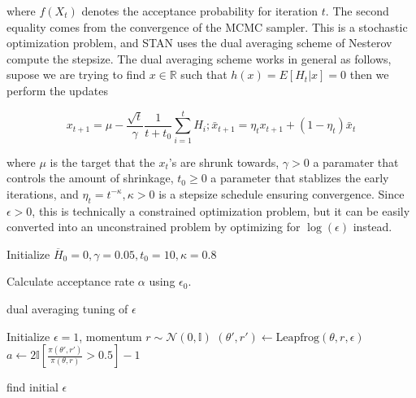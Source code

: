 \documentclass[]{report}
\begin{document}
where $f(X_t)$ denotes the acceptance probability for iteration $t$. The
second equality comes from the convergence of the MCMC sampler. This is a
stochastic optimization problem, and STAN uses the dual averaging scheme of
Nesterov compute the stepsize. The dual averaging scheme works in general as
follows, supose we are trying to find $x\in \mathbb{R}$ such that $h(x) =
E[H_t|x] = 0$ then we perform the updates 

\[x_{t+1}  = \mu - \frac{\sqrt{t}}{\gamma} \frac{1}{t+t_0} \sum_{i=1}^tH_i;
\bar{x}_{t+1} = \eta_t x_{t+1} + (1-\eta_t) \bar{x}_t \]

where $\mu$ is the target that the $x_t$'s are shrunk towards, $\gamma > 0$ a
paramater that controls the amount of shrinkage, $t_0 \ge 0$ a parameter that
stablizes the early iterations, and $\eta_t = t^{-\kappa},\kappa>0$ is a
stepsize schedule ensuring convergence. Since $\epsilon>0$, this is technically
a constrained optimization problem, but it can be easily converted into an
unconstrained problem by optimizing for $\log(\epsilon)$ instead. 

\begin{algorithm}

Initialize $\overline{H}_0 = 0, \gamma = 0.05, t_0 = 10 ,\kappa = 0.8 $ \;
	
	Calculate acceptance rate $\alpha$ using $\epsilon_0$. \;

\caption{dual averaging tuning of $\epsilon$ }
\end{algorithm}


\begin{algorithm}
Initialize $\epsilon = 1$, momentum $r \sim \mathcal{N}(0,\mathbb{I}) $ \;
$(\theta',r') \leftarrow \text{Leapfrog}(\theta,r,\epsilon) $ \;
$a \leftarrow 2 \mathbb{I}[ \frac{\pi(\theta',r')}{\pi(\theta,r)} > 0.5 ] -1 $\;
\KwRet{$\epsilon$}
\caption{find initial $\epsilon$} 
\end{algorithm}
\end{document}
